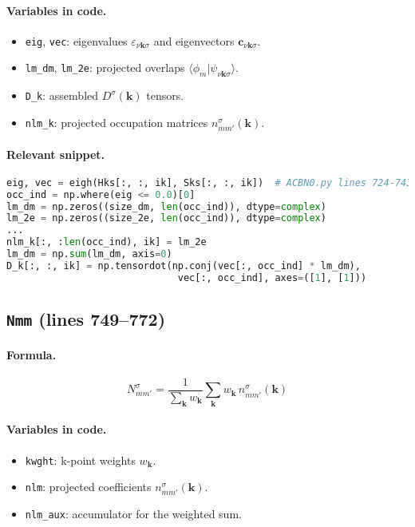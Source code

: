 \documentclass[11pt]{article}
\begin{document}
\paragraph{Variables in code.}
\begin{itemize}[noitemsep]
  \item \verb|eig|, \verb|vec|: eigenvalues $\varepsilon_{\nu\mathbf{k}\sigma}$ and eigenvectors $\mathbf{c}_{\nu\mathbf{k}\sigma}$.
  \item \verb|lm_dm|, \verb|lm_2e|: projected overlaps \(\langle \phi_m | \psi_{\nu\mathbf{k}\sigma}\rangle\).
  \item \verb|D_k|: assembled $D^{\sigma}(\mathbf{k})$ tensors.
  \item \verb|nlm_k|: projected occupation matrices $n^{\sigma}_{mm'}(\mathbf{k})$.
\end{itemize}
\paragraph{Relevant snippet.}
\begin{lstlisting}[language=python]
eig, vec = eigh(Hks[:, :, ik], Sks[:, :, ik])  # ACBN0.py lines 724-743
occ_ind = np.where(eig <= 0.0)[0]
lm_dm = np.zeros((size_dm, len(occ_ind)), dtype=complex)
lm_2e = np.zeros((size_2e, len(occ_ind)), dtype=complex)
...
nlm_k[:, :len(occ_ind), ik] = lm_2e
lm_dm = np.sum(lm_dm, axis=0)
D_k[:, :, ik] = np.tensordot(np.conj(vec[:, occ_ind] * lm_dm),
                              vec[:, occ_ind], axes=([1], [1]))
\end{lstlisting}

\subsection{\texttt{Nmm} (lines 749--772)}
\paragraph{Formula.}
\[N^{\sigma}_{mm'} = \frac{1}{\sum_{\mathbf{k}} w_{\mathbf{k}}} \sum_{\mathbf{k}} w_{\mathbf{k}}\, n^{\sigma}_{mm'}(\mathbf{k})\]
\paragraph{Variables in code.}
\begin{itemize}[noitemsep]
  \item \verb|kwght|: k-point weights $w_{\mathbf{k}}$.
  \item \verb|nlm|: projected coefficients $n^{\sigma}_{mm'}(\mathbf{k})$.
  \item \verb|nlm_aux|: accumulator for the weighted sum.
\end{itemize}
\end{document}
